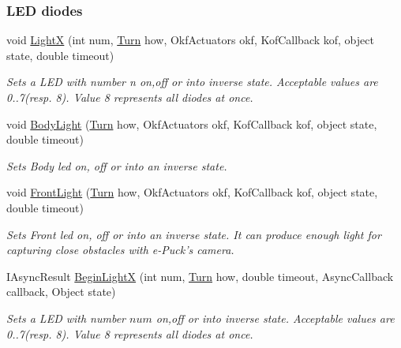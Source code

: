 \subsubsection*{LED diodes} %
\label{ssub:LED diodes}
  \begin{DoxyCompactItemize}

  \item void \hyperlink{class_elib_1_1_epuck_a2c17af7601d0b318f2272f87276c2e87}{LightX} (int num, \hyperlink{namespace_elib_a3bd21aa0f35c1f8d086ea6ac1e09a87c}{Turn} how, OkfActuators okf, KofCallback kof, object state, double timeout)
  \begin{DoxyCompactList}\small\item\em Sets a LED with number n on,off or into inverse state. Acceptable values are 0..7(resp. 8). Value 8 represents all diodes at once. \item\end{DoxyCompactList}

  \item void \hyperlink{class_elib_1_1_epuck_a237316be8571dde0ed2e9c0b2fca6321}{BodyLight} (\hyperlink{namespace_elib_a3bd21aa0f35c1f8d086ea6ac1e09a87c}{Turn} how, OkfActuators okf, KofCallback kof, object state, double timeout)
  \begin{DoxyCompactList}\small\item\em Sets Body led on, off or into an inverse state. \item\end{DoxyCompactList}

  \item void \hyperlink{class_elib_1_1_epuck_a17d5e4e8c2755b6eff667784aa2a12a1}{FrontLight} (\hyperlink{namespace_elib_a3bd21aa0f35c1f8d086ea6ac1e09a87c}{Turn} how, OkfActuators okf, KofCallback kof, object state, double timeout)
  \begin{DoxyCompactList}\small\item\em Sets Front led on, off or into an inverse state. It can produce enough light for capturing close obstacles with e-\/Puck's camera. \item\end{DoxyCompactList}

  \item  IAsyncResult \hyperlink{class_elib_1_1_epuck_ac5cbe768e3e85fc8c627331e539221a1}{BeginLightX} (int num, \hyperlink{namespace_elib_a3bd21aa0f35c1f8d086ea6ac1e09a87c}{Turn} how, double timeout, AsyncCallback callback, Object state)
  \begin{DoxyCompactList}\small\item\em Sets a LED with number $num$ on,off or into inverse state. Acceptable values are 0..7(resp. 8). Value 8 represents all diodes at once. \item\end{DoxyCompactList}
  

\end{DoxyCompactItemize}
